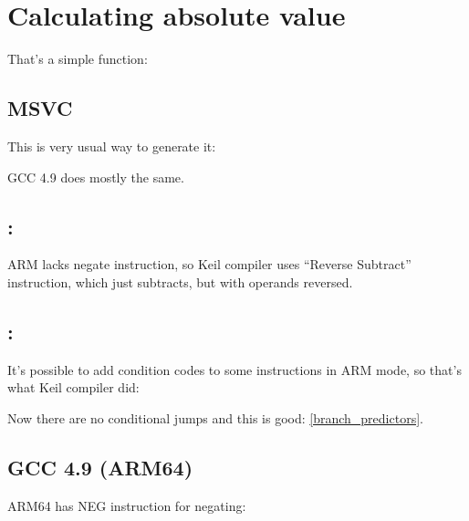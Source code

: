 ﻿\ifx\RUSSIAN\undefined
\section{Calculating absolute value}
\label{sec:abs}

That's a simple function:



\subsection{\Optimizing MSVC}

This is very usual way to generate it:



GCC 4.9 does mostly the same.

\ifdefined\IncludeARM
\subsection{\OptimizingKeilVI: \ThumbMode}



ARM lacks negate instruction, so Keil compiler uses ``Reverse Subtract'' instruction, which just subtracts,
but with operands reversed.

\subsection{\OptimizingKeilVI: \ARMMode}

It's possible to add condition codes to some instructions in ARM mode, so that's what Keil compiler did:



Now there are no conditional jumps and this is good: \ref{branch_predictors}.

\subsection{\NonOptimizing GCC 4.9 (ARM64)}

ARM64 has NEG instruction for negating:


\fi

